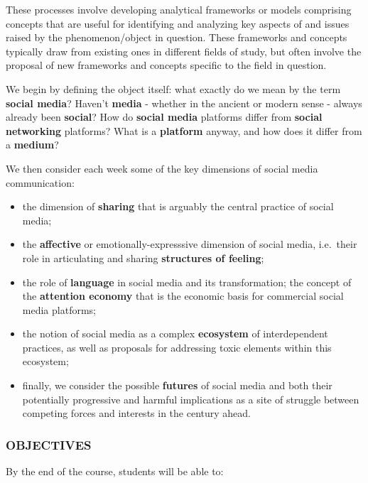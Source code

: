 \documentclass[]{tufte-handout}
\providecommand{\tightlist}{%
  \setlength{\itemsep}{0pt}\setlength{\parskip}{0pt}}
\begin{document}
These processes involve developing analytical frameworks or models
comprising concepts that are useful for identifying and analyzing key
aspects of and issues raised by the phenomenon/object in question. These
frameworks and concepts typically draw from existing ones in different
fields of study, but often involve the proposal of new frameworks and
concepts specific to the field in question.

We begin by defining the object itself: what exactly do we mean by the
term \textbf{social media}? Haven't \textbf{media} - whether in the
ancient or modern sense - always already been \textbf{social}? How do
\textbf{social media} platforms differ from \textbf{social networking}
platforms? What is a \textbf{platform} anyway, and how does it differ
from a \textbf{medium}?

We then consider each week some of the key dimensions of social media
communication:

\begin{itemize}
\tightlist
\item
  the dimension of \textbf{sharing} that is arguably the central
  practice of social media;
\item
  the \textbf{affective} or emotionally-expresssive dimension of social
  media, i.e.~their role in articulating and sharing \textbf{structures
  of feeling};
\item
  the role of \textbf{language} in social media and its transformation;
  the concept of the \textbf{attention economy} that is the economic
  basis for commercial social media platforms;
\item
  the notion of social media as a complex \textbf{ecosystem} of
  interdependent practices, as well as proposals for addressing toxic
  elements within this ecosystem;
\item
  finally, we consider the possible \textbf{futures} of social media and
  both their potentially progressive and harmful implications as a site
  of struggle between competing forces and interests in the century
  ahead.
\end{itemize}

\hypertarget{objectives}{%
\subsubsection{OBJECTIVES}\label{objectives}}

By the end of the course, students will be able to:
\end{document}
